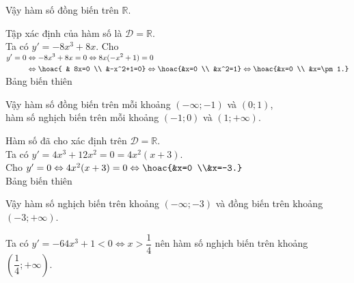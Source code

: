 \begin{vd}
{\begin{enumEX}[a)]{1}
\begin{center}
\begin{tikzpicture}
				\end{tikzpicture}
			\end{center}
			Vậy hàm số đồng biến trên $\mathbb{R}$.
			\item Tập xác định của hàm số là $ \mathscr{D}=\mathbb{R}$.\\
			Ta có $y'=-8x^3+8x$.
			Cho $\begin{aligned}[t]
					y'=0 & \Leftrightarrow -8x^3+8x=0 \Leftrightarrow 8x(-x^2+1)=0        \\
					     & \Leftrightarrow \hoac{                                  & 8x=0 \\ &-x^2+1=0} \Leftrightarrow \hoac{&x=0 \\ &x^2=1} \Leftrightarrow \hoac{&x=0 \\ &x=\pm 1.}
				\end{aligned}$\\
			Bảng biến thiên
			\begin{center}
			\end{center}
			Vậy hàm số đồng biến trên mỗi khoảng $(-\infty;-1)$ và $(0;1)$,\\
			\indent{ } hàm số nghịch biến trên mỗi khoảng $(-1;0)$ và $(1;+\infty)$.
			\item Hàm số đã cho xác định trên $\mathscr{D}=\mathbb{R}$.\\
			Ta có $y'=4x^3+12x^2=0=4x^2(x+3)$.\\
			Cho $y'=0 \Leftrightarrow 4x^2(x+3)=0 \Leftrightarrow \hoac{&x=0 \\&x=-3.}$\\
			Bảng biến thiên
			\begin{center}
			\end{center}
			Vậy hàm số nghịch biến trên khoảng $(-\infty;-3)$ và đồng biến trên khoảng $(-3;+\infty)$.
			\item Ta có $y'=-64x^3+1<0\Leftrightarrow x>\dfrac{1}{4}$ nên hàm số nghịch biến trên khoảng $\left(\dfrac{1}{4};+\infty\right)$.
		\end{enumEX}}
\end{vd}

